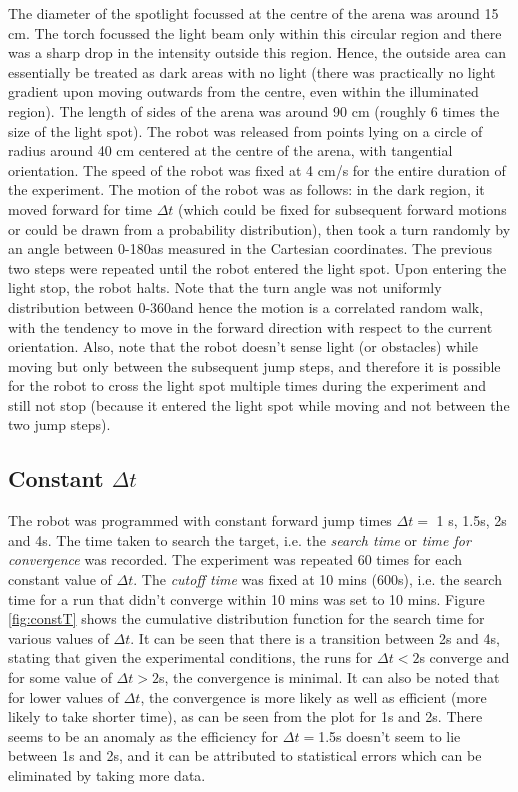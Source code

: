 \documentclass[12pt]{report}
\begin{document}
\begin{justify}
The diameter of the spotlight focussed at the centre of the arena was around 15 cm. The torch focussed the light beam only within this circular region and there was a sharp drop in the intensity outside this region. Hence, the outside area can essentially be treated as dark areas with no light (there was practically no light gradient upon moving outwards from the centre, even within the illuminated region). The length of sides of the arena was around 90 cm (roughly 6 times the size of the light spot). The robot was released from points lying on a circle of radius around 40 cm centered at the centre of the arena, with tangential orientation. The speed of the robot was fixed at 4 cm/s for the entire duration of the experiment. The motion of the robot was as follows: in the dark region, it moved forward for time $\Delta t$ (which could be fixed for subsequent forward motions or could be drawn from a probability distribution), then took a turn randomly by an angle  between 0-180\degree  as measured in the Cartesian coordinates. The previous two steps were repeated until the robot entered the light spot. Upon entering the light stop, the robot halts. Note that the turn angle was not uniformly distribution between 0-360\degree  and hence the motion is a correlated random walk, with the tendency to move in the forward direction with respect to the current orientation. Also, note that the robot doesn't sense light (or obstacles) while moving but only between the subsequent jump steps, and therefore it is possible for the robot to cross the light spot multiple times during the experiment and still not stop (because it entered the light spot while moving and not between the two jump steps).

\subsection{Constant $\Delta t$}  
The robot was programmed with constant forward jump times  $\Delta t = $ 1 s, 1.5s, 2s and 4s. The time taken to search the target, i.e. the \textit{search time} or \textit{time for convergence} was recorded. The experiment was repeated 60 times for each constant value of $\Delta t$. The \textit{cutoff time} was fixed at 10 mins (600s), i.e. the search time for a run that didn't converge within 10 mins was set to 10 mins. Figure \ref{fig:constT} shows the cumulative distribution function for the search time for various values of $\Delta t$. It can be seen that there is a transition between 2s and 4s, stating that given the experimental conditions,  the runs for $\Delta t < 2$s converge and for some value of $\Delta t > 2$s, the convergence is minimal. It can also be noted that for lower values of $\Delta t$, the convergence is more likely as well as efficient (more likely to take shorter time), as can be seen from the plot for 1s and 2s. There seems to be an anomaly as the efficiency for $\Delta t = $1.5s doesn't seem to lie between 1s and 2s, and it can be attributed to statistical errors which can be eliminated by taking more data.\\ 



\end{justify}
\end{document}

